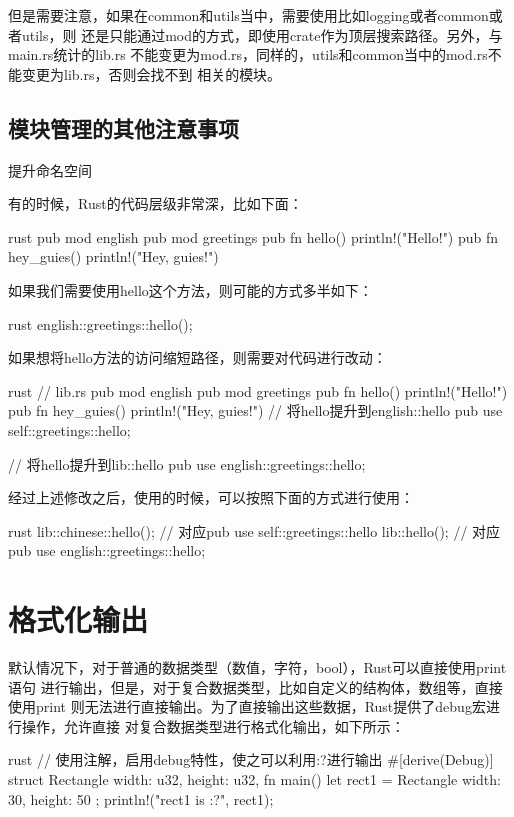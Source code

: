 但是需要注意，如果在common和utils当中，需要使用比如logging或者common或者utils，则
还是只能通过mod的方式，即使用crate作为顶层搜索路径。另外，与main.rs统计的lib.rs
不能变更为mod.rs，同样的，utils和common当中的mod.rs不能变更为lib.rs，否则会找不到
相关的模块。

\subsection{模块管理的其他注意事项}

\begin{outline}[enumerate]
\1 提升命名空间

有的时候，Rust的代码层级非常深，比如下面：
\begin{code-block}{rust}
pub mod english {
    pub mod greetings {
        pub fn hello() {
            println!("Hello!")
        }
        pub fn hey_guies() {
            println!("Hey, guies!")
        }
    }
}
\end{code-block}
如果我们需要使用hello这个方法，则可能的方式多半如下：
\begin{code-block}{rust}
english::greetings::hello();
\end{code-block}
如果想将hello方法的访问缩短路径，则需要对代码进行改动：
\begin{code-block}{rust}
// lib.rs
pub mod english {
    pub mod greetings {
        pub fn hello() {
            println!("Hello!")
        }
        pub fn hey_guies() {
            println!("Hey, guies!")
        }
    }
    // 将hello提升到english::hello
    pub use self::greetings::hello;
}

// 将hello提升到lib::hello
pub use english::greetings::hello;
\end{code-block}
经过上述修改之后，使用的时候，可以按照下面的方式进行使用：
\begin{code-block}{rust}
lib::chinese::hello(); // 对应pub use self::greetings::hello
lib::hello(); // 对应 pub use english::greetings::hello;
\end{code-block}

\end{outline}

\section{格式化输出}
默认情况下，对于普通的数据类型（数值，字符，bool），Rust可以直接使用print语句
进行输出，但是，对于复合数据类型，比如自定义的结构体，数组等，直接使用print
则无法进行直接输出。为了直接输出这些数据，Rust提供了debug宏进行操作，允许直接
对复合数据类型进行格式化输出，如下所示：
\begin{code-block}{rust}
// 使用注解，启用debug特性，使之可以利用:?进行输出
#[derive(Debug)]
struct Rectangle {
    width: u32,
    height: u32,
}
fn main() {
    let rect1 = Rectangle { width: 30, height: 50 };
    println!("rect1 is {:?}", rect1);
}
\end{code-block}

